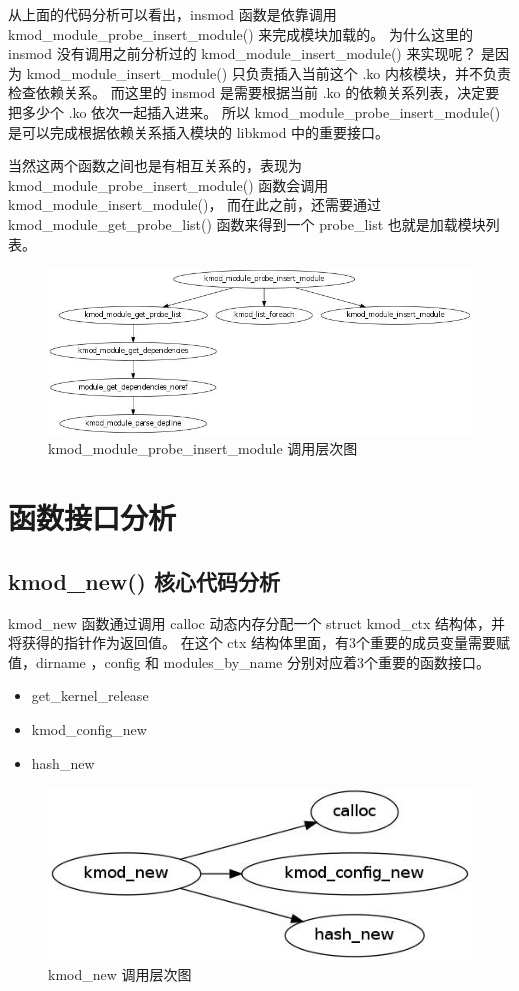 从上面的代码分析可以看出，insmod 函数是依靠调用
kmod\_module\_probe\_insert\_module() 来完成模块加载的。 为什么这里的
insmod 没有调用之前分析过的 kmod\_module\_insert\_module() 来实现呢？
是因为 kmod\_module\_insert\_module() 只负责插入当前这个 .ko
内核模块，并不负责检查依赖关系。 而这里的 insmod 是需要根据当前 .ko
的依赖关系列表，决定要把多少个 .ko 依次一起插入进来。 所以
kmod\_module\_probe\_insert\_module() 是可以完成根据依赖关系插入模块的
libkmod 中的重要接口。

当然这两个函数之间也是有相互关系的，表现为
kmod\_module\_probe\_insert\_module() 函数会调用
kmod\_module\_insert\_module()， 而在此之前，还需要通过
kmod\_module\_get\_probe\_list() 函数来得到一个 probe\_list
也就是加载模块列表。

\begin{figure}[htbp]
\centering
\includegraphics{./figures/kmod_module_probe_insert_module.jpg}
\caption{kmod\_module\_probe\_insert\_module 调用层次图}
\end{figure}

\section{函数接口分析}

\subsection{kmod\_new() 核心代码分析}

kmod\_new 函数通过调用 calloc 动态内存分配一个 struct kmod\_ctx
结构体，并将获得的指针作为返回值。 在这个 ctx
结构体里面，有3个重要的成员变量需要赋值，dirname ，config 和
modules\_by\_name 分别对应着3个重要的函数接口。

\begin{itemize}
\item
  get\_kernel\_release
\item
  kmod\_config\_new
\item
  hash\_new
\end{itemize}
\begin{figure}[htbp]
\centering
\includegraphics{./figures/kmod_new.jpg}
\caption{kmod\_new 调用层次图}
\end{figure}

